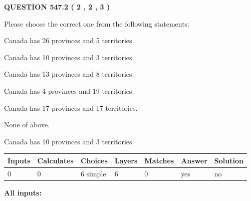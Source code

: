 \documentclass[12pt]{article}
\begin{document}
   
  
\vspace{0.2in}
  
{\textbf{\Large{QUESTION
547.2 
 ( 2 , 2 , 3 )
}}}
  
  
Please choose the correct one from the following statements:
 
 
Canada has  26 provinces and  5 territories.
 
 
Canada has 10  provinces and 3 territories.
 
 
Canada has  13 provinces and  8 territories.
 
 
Canada has   4 provinces and  19 territories.
 
 
Canada has  17 provinces and  17 territories.
 
 
 None of above.
 
 
\noindent{}
 
 
Canada has 10  provinces and 3 territories.
 
 
\noindent{}
 
 
   
   
   
   
\noindent\begin{tabular}{|l|l|l|l|l|l|l|}
 \hline
Inputs & Calculates & Choices & Layers & Matches & Answer & Solution \\ \hline
 0  & 
 0  & 
 6
  simple  
  & 
 6  & 
 0  & 
  yes & 
  no 
  \\ \hline
 \end{tabular}
   
   
   
   
\noindent{}
   
   
   
   
\noindent\vspace{0.1in}\hspace{-0.08in} {\textbf{\Large{All inputs: }}}
   
   
   
   
   
   
 \vspace{0.2in}
 
\end{document}
